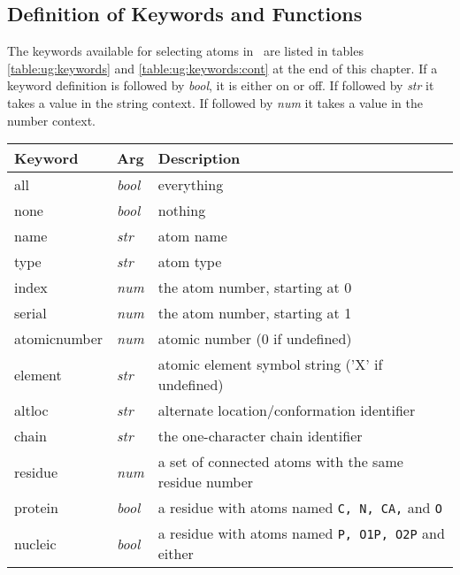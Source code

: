 \subsection{Definition of Keywords and Functions}
The keywords available for selecting atoms in \VMD\ are listed in tables
\ref{table:ug:keywords} and \ref{table:ug:keywords:cont} at the end of
this chapter.
If a keyword definition is followed by {\it bool}, it is either
on or off.  If followed by {\it str} it takes a value in the
string context.  If followed by {\it num} it takes a value in the
number context.


\begin{table}[htb]
\hspace{0.25in}
\begin{tabular}{|p{.9 in}| p{.4 in}| p{4.5in}| } 
\hline
Keyword & Arg & Description \\ 
\hline \hline
all           & {\it bool}  & everything \\
none          & {\it bool}  & nothing \\
name          & {\it str}   & atom name \\
type          & {\it str}   & atom type \\
index         & {\it num}   & the atom number, starting at 0 \\
serial        & {\it num}   & the atom number, starting at 1 \\
atomicnumber  & {\it num}   & atomic number (0 if undefined) \\
element       & {\it str}   & atomic element symbol string ('X' if undefined) \\
altloc        & {\it str}   & alternate location/conformation identifier \\
chain         & {\it str}   & the one-character chain identifier \\
residue       & {\it num}   & a set of connected atoms with the same residue number \\
protein       & {\it bool}  & a residue with atoms named {\tt C, N, CA,} and {\tt O} \\
nucleic       & {\it bool}  & a residue with atoms named {\tt P, O1P, O2P} and either \\

\end{tabular}
\end{table}
